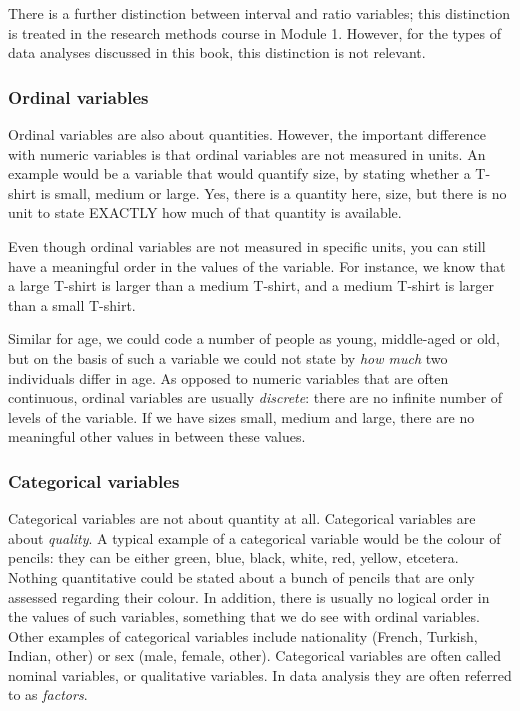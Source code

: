 There is a further distinction between interval and ratio variables; this distinction is treated in the research methods course in Module 1. However, for the types of data analyses discussed in this book, this distinction is not relevant. 

\subsubsection{Ordinal variables}

Ordinal variables are also about quantities. However, the important difference with numeric variables is that ordinal variables are not measured in units. An example would be a variable that would quantify size, by stating whether a T-shirt is small, medium or large. Yes, there is a quantity here, size, but there is no unit to state EXACTLY how much of that quantity is available. 

Even though ordinal variables are not measured in specific units, you can still have a meaningful order in the values of the variable. For instance, we know that a large T-shirt is larger than a medium T-shirt, and a medium T-shirt is larger than a small T-shirt.

Similar for age, we could code a number of people as young, middle-aged or old, but on the basis of such a variable we could not state by \textit{how much} two individuals differ in age. As opposed to numeric variables that are often continuous, ordinal variables are usually \textit{discrete}: there are no infinite number of levels of the variable. If we have sizes small, medium and large, there are no meaningful other values in between these values. 

\subsubsection{Categorical variables}

Categorical variables are not about quantity at all. Categorical variables are about \textit{quality}. A typical example of a categorical variable would be the colour of pencils: they can be either green, blue, black, white, red, yellow, etcetera. Nothing quantitative could be stated about a bunch of pencils that are only assessed regarding their colour. In addition, there is usually no logical order in the values of such variables, something that we do see with ordinal variables. Other examples of categorical variables include nationality (French, Turkish, Indian, other) or sex (male, female, other). Categorical variables are often called nominal variables, or qualitative variables. In data analysis they are often referred to as \textit{factors}.

